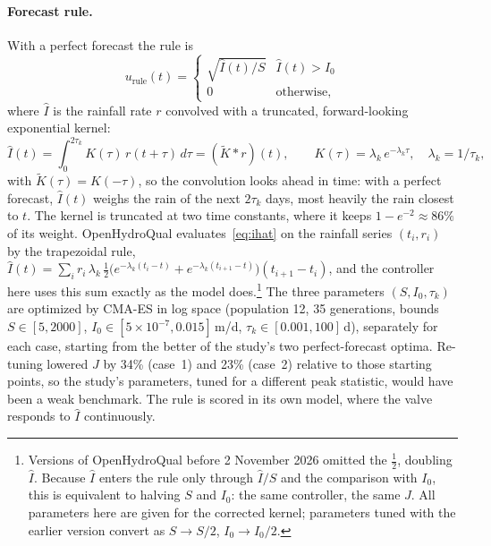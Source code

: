 \documentclass[11pt]{article}
\begin{document}
\paragraph{Forecast rule.} With a perfect forecast the rule is
\begin{equation}
u_{\mathrm{rule}}(t) = \begin{cases}\sqrt{\hat I(t)/S} & \hat I(t) > I_0\\ 0 & \text{otherwise},\end{cases}
\end{equation}
where $\hat I$ is the rainfall rate $r$ convolved with a truncated, forward-looking
exponential kernel:
\begin{equation}
\hat I(t) = \int_{0}^{2\tau_k} K(\tau)\, r(t+\tau)\, d\tau = (\tilde K * r)(t),
\qquad K(\tau) = \lambda_k\, e^{-\lambda_k \tau},\quad \lambda_k = 1/\tau_k,
\label{eq:ihat}
\end{equation}
with $\tilde K(\tau) = K(-\tau)$, so the convolution looks ahead in time: with a perfect
forecast, $\hat I(t)$ weighs the rain of the next $2\tau_k$ days, most heavily the rain
closest to $t$. The kernel is truncated at two time constants, where it keeps
$1-e^{-2} \approx 86\%$ of its weight. OpenHydroQual evaluates~\eqref{eq:ihat} on the
rainfall series $(t_i, r_i)$ by the trapezoidal rule,
$\hat I(t) = \sum_i r_i\,\lambda_k\,\tfrac12\big(e^{-\lambda_k (t_i - t)} + e^{-\lambda_k
(t_{i+1}-t)}\big)(t_{i+1}-t_i)$, and the controller here uses this sum exactly as the model
does.\footnote{Versions of OpenHydroQual before 2 November 2026 omitted the $\tfrac12$,
doubling $\hat I$. Because $\hat I$ enters the rule only through $\hat I/S$ and the
comparison with $I_0$, this is equivalent to halving $S$ and $I_0$: the same controller,
the same $J$. All parameters here are given for the corrected kernel; parameters tuned with
the earlier version convert as $S \to S/2$, $I_0 \to I_0/2$.} The three parameters $(S, I_0, \tau_k)$ are optimized by CMA-ES in log
space (population 12, 35 generations, bounds $S\in[5,2000]$,
$I_0\in[5\times10^{-7},0.015]$\,m/d, $\tau_k\in[0.001,100]$\,d), separately for each case, starting
from the better of the study's two perfect-forecast optima. Re-tuning lowered $J$ by 34\%
(case~1) and 23\% (case~2) relative to those starting points, so the study's parameters,
tuned for a different peak statistic, would have been a weak benchmark. The rule is scored
in its own model, where the valve responds to $\hat I$ continuously.
\end{document}
